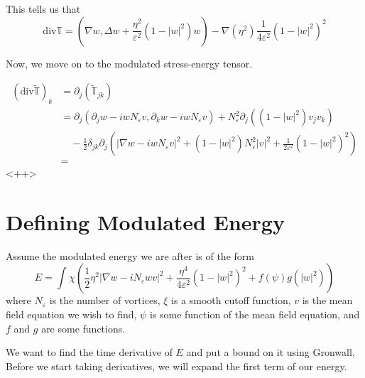 \documentclass[a4paper]{article}
\renewcommand{\div}{\mathrm{div}}
\begin{document}
This tells us that
\begin{equation} \label{eqn:div_stress_energy}
  \div \mathbb{T} = ( \nabla w, \Delta w + \frac{\eta^2}{\varepsilon^2} (1 - |w|^2)w) - \nabla(\eta^2) \frac{1}{4 \varepsilon^2} (1 - |w|^2)^2
\end{equation}

Now, we move on to the modulated stress-energy tensor.

\begin{align}
  (\div \tilde{\mathbb{T}})_k &= \partial_j (\tilde{\mathbb{T}}_{jk}) \nonumber \\
  &= \partial_j (\partial_j w - iw N_\varepsilon v, \partial_k w - iw N_\varepsilon v) + N_\varepsilon^2 \partial_j \left( (1-|w|^2) v_j v_k \right)
  \nonumber \\
  &\quad - \frac{1}{2} \delta_{jk} \partial_j \left( |\nabla w - iw N_\varepsilon v|^2 + (1-|w|^2)N_\varepsilon^2 |v|^2 + \frac{1}{2 \varepsilon^2}
  (1-|w|^2)^2 \right) \nonumber \\
  &=
  \label{<++>}
\end{align}<++>

\section{Defining Modulated Energy}
Assume the modulated energy we are after is of the form
\begin{equation} \label{eqn:energy_form_primitive}
  E = \int_{}^{} \chi \left( \frac{1}{2} \eta^2 |\nabla w - i N_\varepsilon w v|^2 + \frac{\eta^4}{4 \varepsilon^2} ( 1 - |w|^2)^2 + f(\psi) g(|w|^2) \right)
\end{equation}
where $N_\varepsilon$ is the number of vortices, $\xi$ is a smooth cutoff function, $v$ is the mean field equation we wish to find, $\psi$ is some
function of the mean field equation, and $f$ and $g$ are some functions.

We want to find the time derivative of $E$ and put a bound on it using Gronwall.
Before we start taking derivatives, we will expand the first term of our energy.
\end{document}
